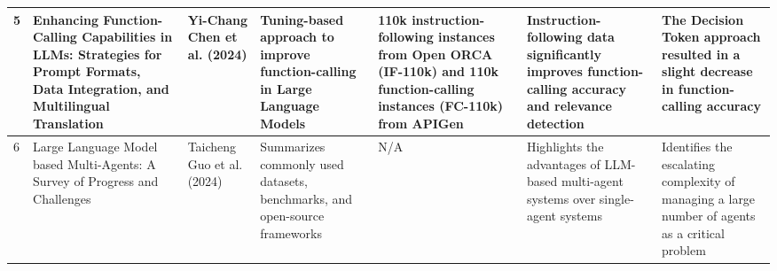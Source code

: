\begin{table}[H]
{\begin{tabular}{|l|p{2.2cm}|p{1.8cm}|p{2.4cm}|p{2.0cm}|p{2.2cm}|p{2.4cm}|}
\hline
5 & Enhancing Function-Calling Capabilities in LLMs: Strategies for Prompt Formats, Data Integration, and Multilingual Translation & Yi-Chang Chen et al. (2024) & Tuning-based approach to improve function-calling in Large Language Models & 110k instruction-following instances from Open ORCA (IF-110k) and 110k function-calling instances (FC-110k) from APIGen & Instruction-following data significantly improves function-calling accuracy and relevance detection & The Decision Token approach resulted in a slight decrease in function-calling accuracy \\
\hline
6 & Large Language Model based Multi-Agents: A Survey of Progress and Challenges & Taicheng Guo et al. (2024) & Summarizes commonly used datasets, benchmarks, and open-source frameworks & N/A & Highlights the advantages of LLM-based multi-agent systems over single-agent systems & Identifies the escalating complexity of managing a large number of agents as a critical problem \\
\hline
\end{tabular}%
}
\end{table}

